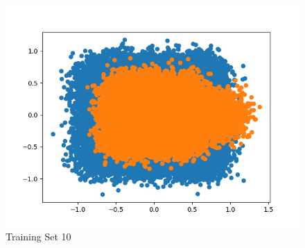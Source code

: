 \documentclass{article}
\begin{document}
\begin{figure}[H]
        \centering
	\begin{minipage}{.33\textwidth}
			\centering
			\includegraphics[width=1\linewidth]{../TrainSet 10.png}
			\caption{Training Set 10}
	\end{minipage}\hfill
\end{figure}
\end{document}
